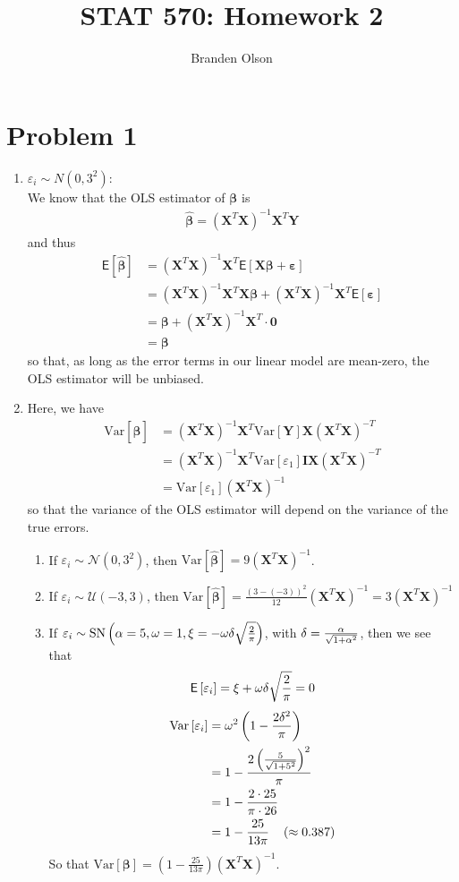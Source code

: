 \documentclass[11pt]{article}
\newcommand*\htab{\hspace{4 mm}}
\newcommand*\ba{\[ \begin{aligned}}
\newcommand*\ea{\end{aligned} \]}
\newcommand*\eps{\epsilon}
\newcommand*\E[1]{\mathsf{E}\left[#1\right]}
\newcommand*\Var[1]{\text{Var}\left[#1\right]}
\newcommand*\estim[1]{\widehat{#1}}
\newcommand*\bI{\mathbf{I}}
\newcommand*\bX{\mathbf{X}}
\newcommand*\bY{\mathbf{Y}}
\newcommand*\bzero{\mathbf{0}}
\newcommand*\bbeta{\boldsymbol{\beta}}
\newcommand*\beps{\boldsymbol{\varepsilon}}
\renewcommand\;{\,}
\renewcommand\epsilon{\varepsilon}
\begin{document}
\title{STAT 570: Homework 2}
\author{Branden Olson}
\date{}
\maketitle

\section*{Problem 1}
\begin{enumerate}[label=(\alph*)]
\item
$\eps_i \sim N(0, 3^2)$:
\\
We know that the OLS estimator of $\bbeta$ is
\ba
\estim{\bbeta} = (\bX^T \bX)^{-1} \bX^T \bY
\ea
and thus
\ba
\E{\estim{\bbeta}} & = (\bX^T \bX)^{-1} \bX^T \E{ \bX \bbeta + \beps} \\
	& = (\bX^T \bX)^{-1} \bX^T \bX \bbeta + (\bX^T \bX)^{-1} \bX^T \E{\beps} \\
	& = \bbeta + (\bX^T \bX)^{-1} \bX^T \cdot \bzero \\
	& = \bbeta
\ea
so that, as long as the error terms in our linear model are mean-zero, the OLS estimator will be unbiased. 
\item
Here, we have
\ba
\Var{\estim{\bbeta}} & = 
	(\bX^T \bX)^{-1} \bX^T \Var{\bY} \bX (\bX^T \bX)^{-T} \\
	& = (\bX^T \bX)^{-1} \bX^T \Var{\eps_1} \bI \bX (\bX^T \bX)^{-T} \\
	& = \Var{\eps_1} (\bX^T \bX)^{-1}
\ea
so that the variance of the OLS estimator will depend on the variance of the true errors. 
\begin{enumerate}[label=(\roman*)]
\item If $\eps_i \sim \mathcal N(0, 3^2)$, then
$\Var{\estim{\bbeta}} = 9 (\bX^T \bX)^{-1}$.
\item If $\eps_i \sim \mathcal U(-3, 3)$, then 
$\Var{\estim{\bbeta}} = \frac{(3 - (-3))^2}{12} (\bX^T \bX)^{-1}
= 3 (\bX^T \bX)^{-1}$
\item If 
$\eps_i \sim \text{SN}\left(\alpha=5, \omega=1, \xi=-\omega \delta \sqrt{2\over\pi}\right)$, with $\delta = {\alpha \over \sqrt{1 + \alpha^2}}$, then we see that
\ba
\E{\eps_i} = \xi + \omega \delta \sqrt{2\over\pi} = 0
\ea
\ba
\Var{\eps_i} & = \omega^2 \left(1 - \frac{2\delta^2}{\pi}\right) \\
	& = 1 - \frac{2 \left(\frac{5}{\sqrt{1 + 5^2}}\right)^2}{ \pi} \\
	& = 1 - \frac{2 \cdot 25}{\pi \cdot 26} \\
	& = 1 - \frac{25}{13\pi}  \htab (\approx 0.387)
\ea
So that $\Var{\bbeta} = \left(1 - \frac{25}{13\pi}\right) (\bX^T \bX)^{-1}$.
\end{enumerate}
 

\end{enumerate}
\end{document}
